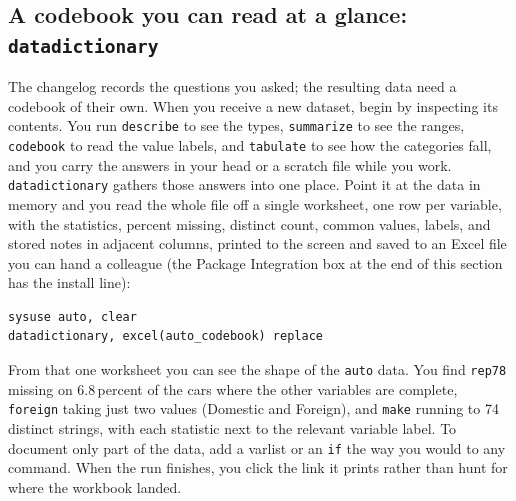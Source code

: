\documentclass[
    a4paper,
    fontsize=10pt,
    twoside=true,
    numbers=noenddot,
]{kaobook}
\begin{document}
\subsection{A codebook you can read at a glance: \texttt{datadictionary}}\label{sec:datadictionary}
The changelog records the questions you asked; the resulting data need a codebook of their own. When you receive a new dataset, begin by inspecting its contents. You run \texttt{describe} to see the types, \texttt{summarize} to see the ranges, \texttt{codebook} to read the value labels, and \texttt{tabulate} to see how the categories fall, and you carry the answers in your head or a scratch file while you work. \texttt{datadictionary} gathers those answers into one place. Point it at the data in memory and you read the whole file off a single worksheet, one row per variable, with the statistics, percent missing, distinct count, common values, labels, and stored notes in adjacent columns, printed to the screen and saved to an Excel file you can hand a colleague (the Package Integration box at the end of this section has the install line):
\par
{\footnotesize
\begin{verbatim}
sysuse auto, clear
datadictionary, excel(auto_codebook) replace
\end{verbatim}
}
From that one worksheet you can see the shape of the \texttt{auto} data. You find \texttt{rep78} missing on 6.8\,percent of the cars where the other variables are complete, \texttt{foreign} taking just two values (Domestic and Foreign), and \texttt{make} running to 74 distinct strings, with each statistic next to the relevant variable label. To document only part of the data, add a varlist or an \texttt{if} the way you would to any command. When the run finishes, you click the link it prints rather than hunt for where the workbook landed.
\end{document}

